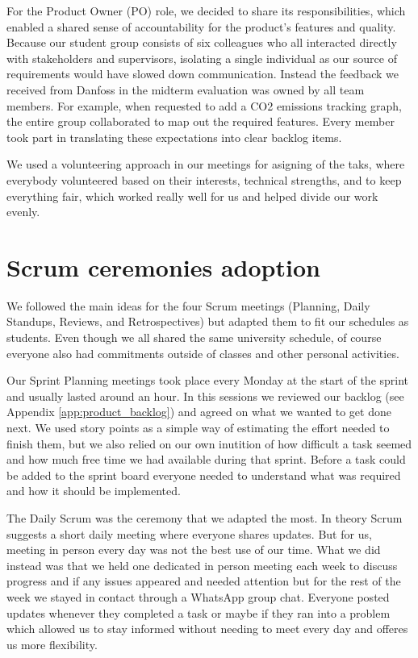 For the Product Owner (PO) role, we decided to share its responsibilities, which enabled a shared sense of accountability for the product's features and quality. Because our student group consists of six colleagues who all interacted directly with stakeholders and supervisors, isolating a single individual as our source of requirements would have slowed down communication. Instead the feedback we received from Danfoss in the midterm evaluation was owned by all team members. For example, when requested to add a CO2 emissions tracking graph, the entire group collaborated to map out the required features. Every member took part in translating these expectations into clear backlog items.

We used a volunteering approach in our meetings for asigning of the taks, where everybody volunteered based on their interests, technical strengths, and to keep everything fair, which worked really well for us and helped divide our work evenly.

\section{Scrum ceremonies adoption}

We followed the main ideas for the four Scrum meetings (Planning, Daily Standups, Reviews, and Retrospectives) but adapted them to fit our schedules as students. Even though we all shared the same university schedule, of course everyone also had commitments outside of classes and other personal activities.

Our Sprint Planning meetings took place every Monday at the start of the sprint and usually lasted around an hour. In this sessions we reviewed our backlog (see Appendix \ref{app:product_backlog}) and agreed on what we wanted to get done next. We used story points as a simple way of estimating the effort needed to finish them, but we also relied on our own inutition of how difficult a task seemed and how much free time we had available during that sprint. Before a task could be added to the sprint board everyone needed to understand what was required and how it should be implemented.

The Daily Scrum was the ceremony that we adapted the most. In theory Scrum suggests a short daily meeting where everyone shares updates. But for us, meeting in person every day was not the best use of our time. What we did instead was that we held one dedicated in person meeting each week to discuss progress and if any issues appeared and needed attention but for the rest of the week we stayed in contact through a WhatsApp group chat. Everyone posted updates whenever they completed a task or maybe if they ran into a problem which allowed us to stay informed without needing to meet every day and offeres us more flexibility.

